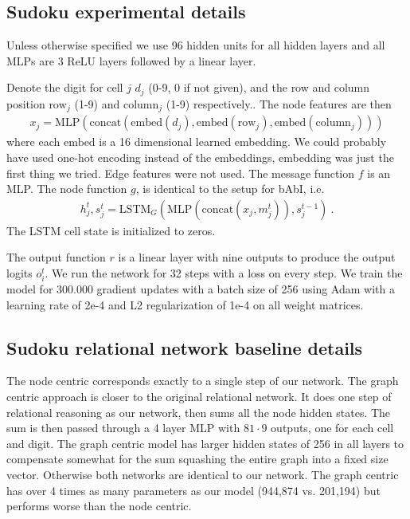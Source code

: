 \subsection{Sudoku experimental details}
Unless otherwise specified we use 96 hidden units for all hidden layers and all MLPs are 3 ReLU layers followed by a linear layer.

Denote the digit for cell $j$ $d_j$ (0-9, 0 if not given), and the row and column position $\text{row}_j$ (1-9) and $\text{column}_j$ (1-9) respectively..
The node features are then
\begin{align*}
	x_j = \text{MLP}(\text{concat}(\text{embed}(d_j),\text{embed}(\text{row}_j),\text{embed}(\text{column}_j)))
\end{align*}
where each $\text{embed}$ is a 16 dimensional learned embedding. We could probably have used one-hot encoding instead of the embeddings, embedding was just the first thing we tried. Edge features were not used.
The message function $f$ is an MLP. The node function $g$, is identical to the setup for bAbI, i.e.
\begin{align*}
	h_j^t, s_j^t = \text{LSTM}_G(\text{MLP}(\text{concat}(x_j, m_{j}^t)), s_j^{t-1}) \ .
\end{align*}
The LSTM cell state is initialized to zeros.

The output function $r$ is a linear layer with nine outputs to produce the output logits $o_i^t$. 
We run the network for 32 steps with a loss on every step. We train the model for 300.000 gradient updates with a batch size of 256 using Adam with a learning rate of 2e-4 and L2 regularization of 1e-4 on all weight matrices.

\subsection{Sudoku relational network baseline details}
The node centric corresponds exactly to a single step of our network.
The graph centric approach is closer to the original relational network.
It does one step of relational reasoning as our network, then sums all the node hidden states. The sum is then passed through a 4 layer MLP with $81\cdot9$ outputs, one for each cell and digit. The graph centric model has larger hidden states of 256 in all layers to compensate somewhat for the sum squashing the entire graph into a fixed size vector. Otherwise both networks are identical to our network. The graph centric has over 4 times as many parameters as our model (944,874 vs. 201,194) but performs worse than the node centric.

